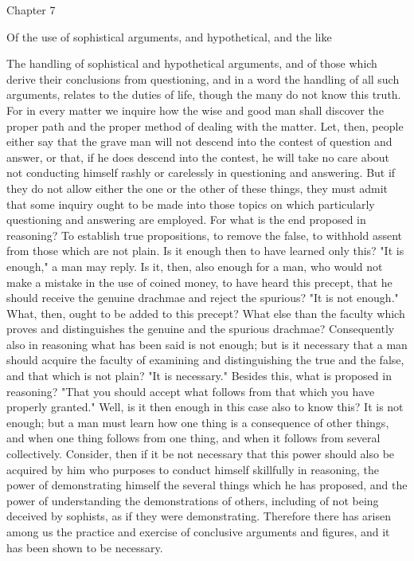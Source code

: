 \documentclass[a4paper]{article}
\begin{document}
Chapter 7

Of the use of sophistical arguments, and hypothetical, and the like

The handling of sophistical and hypothetical arguments, and of those
which derive their conclusions from questioning, and in a word the
handling of all such arguments, relates to the duties of life, though
the many do not know this truth. For in every matter we inquire how
the wise and good man shall discover the proper path and the proper
method of dealing with the matter. Let, then, people either say that
the grave man will not descend into the contest of question and answer,
or that, if he does descend into the contest, he will take no care
about not conducting himself rashly or carelessly in questioning and
answering. But if they do not allow either the one or the other of
these things, they must admit that some inquiry ought to be made into
those topics on which particularly questioning and answering are employed.
For what is the end proposed in reasoning? To establish true propositions,
to remove the false, to withhold assent from those which are not plain.
Is it enough then to have learned only this? "It is enough," a man
may reply. Is it, then, also enough for a man, who would not make
a mistake in the use of coined money, to have heard this precept,
that he should receive the genuine drachmae and reject the spurious?
"It is not enough." What, then, ought to be added to this precept?
What else than the faculty which proves and distinguishes the genuine
and the spurious drachmae? Consequently also in reasoning what has
been said is not enough; but is it necessary that a man should acquire
the faculty of examining and distinguishing the true and the false,
and that which is not plain? "It is necessary." Besides this, what
is proposed in reasoning? "That you should accept what follows from
that which you have properly granted." Well, is it then enough in
this case also to know this? It is not enough; but a man must learn
how one thing is a consequence of other things, and when one thing
follows from one thing, and when it follows from several collectively.
Consider, then if it be not necessary that this power should also
be acquired by him who purposes to conduct himself skillfully in reasoning,
the power of demonstrating himself the several things which he has
proposed, and the power of understanding the demonstrations of others,
including of not being deceived by sophists, as if they were demonstrating.
Therefore there has arisen among us the practice and exercise of conclusive
arguments and figures, and it has been shown to be necessary.
\end{document}
